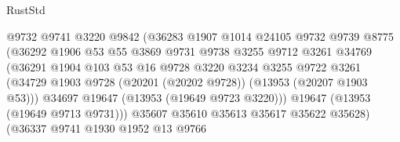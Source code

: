 \begin{lexlean}{RustStd}
\begin{coremodule}
                                    @9732
                                    @9741
                                    @3220
                                    @9842
                                    (@36283
                                      @1907
                                      @1014
                                      @24105
                                      @9732
                                      @9739
                                      @8775
                                      (@36292
                                        @1906
                                        @53
                                        @55
                                        @3869
                                        @9731
                                        @9738
                                        @3255
                                        @9712
                                        @3261
                                        @34769
                                        (@36291
                                          @1904
                                          @103
                                          @53
                                          @16
                                          @9728
                                          @3220
                                          @3234
                                          @3255
                                          @9722
                                          @3261
                                          (@34729
                                            @1903
                                            @9728
                                            (@20201 (@20202 @9728))
                                            (@13953 (@20207 @1903 @53)))
                                          @34697
                                          @19647
                                          (@13953 (@19649 @9723 @3220)))
                                        @19647
                                        (@13953 (@19649 @9713 @9731)))
                                      @35607
                                      @35610
                                      @35613
                                      @35617
                                      @35622
                                      @35628)
                                    (@36337
                                      @9741
                                      @1930
                                      @1952
                                      @13
                                      @9766

\end{coremodule}
\end{lexlean}
